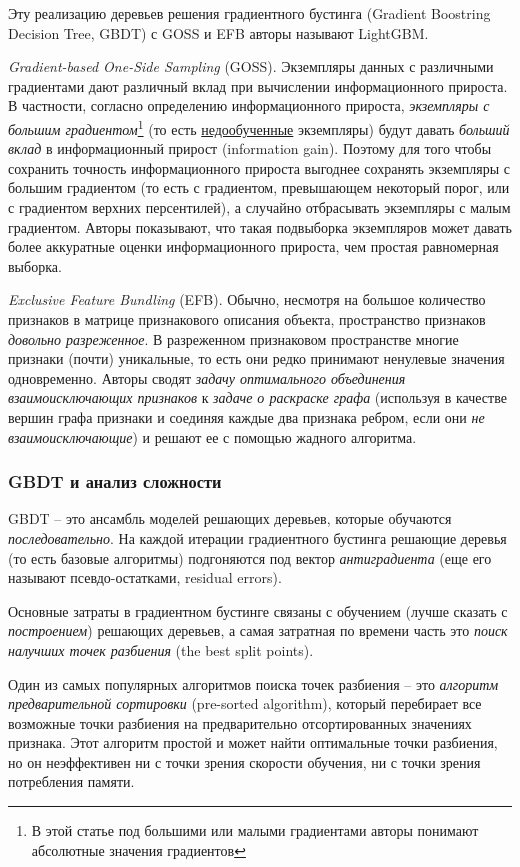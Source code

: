\documentclass[%
	11pt,
	a4paper,
	utf8,
		]{article}
\begin{document}
Эту реализацию деревьев решения градиентного бустинга (Gradient Boostring Decision Tree, GBDT) с GOSS и EFB авторы называют LightGBM. 

\emph{Gradient-based One-Side Sampling} (GOSS). Экземпляры данных с различными градиентами дают различный вклад при вычислении информационного прироста. В частности, согласно определению информационного прироста, \emph{экземпляры с большим градиентом}\footnote{В этой статье под большими или малыми градиентами авторы понимают абсолютные значения градиентов} (то есть \underline{недообученные} экземпляры) будут давать \emph{больший вклад} в информационный прирост (information gain). Поэтому для того чтобы сохранить точность информационного прироста выгоднее сохранять экземпляры с большим градиентом (то есть с градиентом, превышающем некоторый порог, или с градиентом верхних персентилей), а случайно отбрасывать экземпляры с малым градиентом. Авторы показывают, что такая подвыборка экземпляров может давать более аккуратные оценки информационного прироста, чем простая равномерная выборка.

\emph{Exclusive Feature Bundling} (EFB). Обычно, несмотря на большое количество признаков в матрице признакового описания объекта, пространство признаков \emph{довольно разреженное}. В разреженном признаковом пространстве многие признаки (почти) уникальные, то есть они редко принимают ненулевые значения одновременно. Авторы сводят \emph{задачу оптимального объединения взаимоисключающих признаков} к \emph{задаче о раскраске графа} (используя в качестве вершин графа признаки и соединяя каждые два признака ребром, если они \emph{не взаимоисключающие}) и решают ее с помощью жадного алгоритма.

\subsubsection{GBDT и анализ сложности}

GBDT -- это ансамбль моделей решающих деревьев, которые обучаются \emph{последовательно}. На каждой итерации градиентного бустинга решающие деревья (то есть базовые алгоритмы) подгоняются под вектор \emph{антиградиента} (еще его называют псевдо-остатками, residual errors).

Основные затраты в градиентном бустинге связаны с обучением (лучше сказать с \emph{построением}) решающих деревьев, а самая затратная по времени часть это \emph{поиск налучших точек разбиения} (the best split points).

Один из самых популярных алгоритмов поиска точек разбиения -- это \emph{алгоритм предварительной сортировки} (pre-sorted algorithm), который перебирает все возможные точки разбиения на предварительно отсортированных значениях признака. Этот алгоритм простой и может найти оптимальные точки разбиения, но он неэффективен ни с точки зрения скорости обучения, ни с точки зрения потребления памяти.
\end{document}
